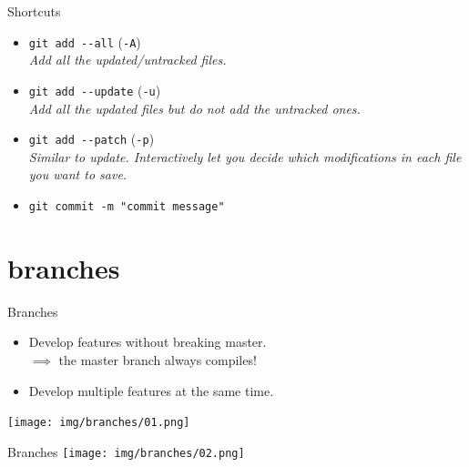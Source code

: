 \documentclass[usenames,dvipsnames,9pt]{beamer}
\begin{document}
%
\begin{frame}{Shortcuts}
  \begin{itemize}
    \item \lstinline|git add --all| \hspace{1cm}(\lstinline|-A|)\\
    \emph{Add all the updated/untracked files.}
    \item \lstinline|git add --update| \hspace{1cm}(\lstinline|-u|)\\
    \emph{Add all the updated files but do not add the untracked ones.}
    \item \lstinline|git add --patch| \hspace{1cm}(\lstinline|-p|)\\
    \emph{Similar to update. Interactively let you decide which modifications in each file you want to save.}
    \item \lstinline|git commit -m "commit message"|
  \end{itemize}
\end{frame}



%
%
\section{branches}

%
\begin{frame}{Branches}
  \begin{itemize}
    \item Develop features without breaking master.\\
    $\implies$ the master branch always compiles! {\color{OliveGreen}\checkmark}
    \item Develop multiple features at the same time.
  \end{itemize}
  \vspace{0.5cm}
  \texttt{[image: img/branches/01.png]}
\end{frame}

%
\begin{frame}{Branches}
  \vspace{-0.45cm}
  \texttt{[image: img/branches/02.png]}
\end{frame}
\end{document}
